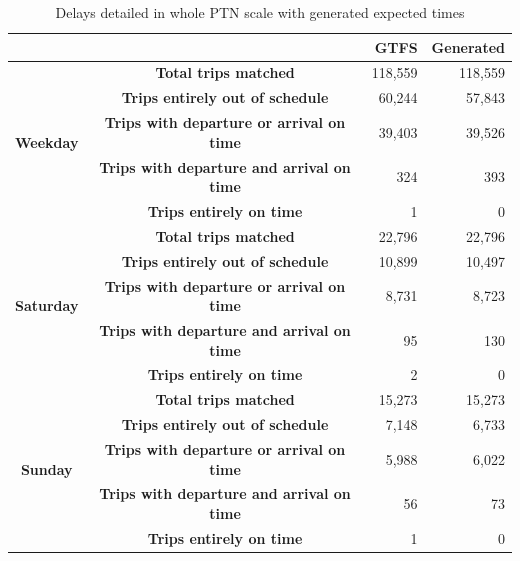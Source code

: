 \begin{table}[h]
\centering
\caption{Delays detailed in whole PTN scale with generated expected times}
\begin{tabular}{|c|c|c|r|r|}
\hline
\multicolumn{3}{|c|}{} &   GTFS  &  Generated  \\
\hline
 \multirow{5}{*}{\textbf{Weekday}} & \multicolumn{2}{|c|}{\textbf{Total trips matched}} &118,559 &  118,559 \\\cline{2-5}
 & \multicolumn{2}{|c|}{\textbf{Trips entirely out of schedule}} &60,244  & 57,843 \\\cline{2-5}
 & \multicolumn{2}{|c|}{\textbf{Trips with departure or arrival on time}} &39,403 & 39,526  \\\cline{2-5}
 & \multicolumn{2}{|c|}{\textbf{Trips with departure and arrival on time}} &324 & 393\\\cline{2-5}
 & \multicolumn{2}{|c|}{\textbf{Trips entirely on time}} &1&0 \\
\hline
 \multirow{5}{*}{\textbf{Saturday}} & \multicolumn{2}{|c|}{\textbf{Total trips matched}} &22,796 &  22,796\\\cline{2-5}
 & \multicolumn{2}{|c|}{\textbf{Trips entirely out of schedule}} & 10,899  & 10,497 \\\cline{2-5}
 & \multicolumn{2}{|c|}{\textbf{Trips with departure or arrival on time}} &8,731 & 8,723  \\\cline{2-5}
 & \multicolumn{2}{|c|}{\textbf{Trips with departure and arrival on time}} &95 & 130 \\\cline{2-5}
 & \multicolumn{2}{|c|}{\textbf{Trips entirely on time}} &2&0 \\
\hline
 \multirow{5}{*}{\textbf{Sunday}} & \multicolumn{2}{|c|}{\textbf{Total trips matched}} &15,273 &  15,273\\\cline{2-5}
 & \multicolumn{2}{|c|}{\textbf{Trips entirely out of schedule}} & 7,148  & 6,733 \\\cline{2-5}
 & \multicolumn{2}{|c|}{\textbf{Trips with departure or arrival on time}} &5,988 & 6,022  \\\cline{2-5}
 & \multicolumn{2}{|c|}{\textbf{Trips with departure and arrival on time}} &56 & 73 \\\cline{2-5}
 & \multicolumn{2}{|c|}{\textbf{Trips entirely on time}} &1&0 \\
\hline
\end{tabular}
\label{tab:delay2}
\end{table}

